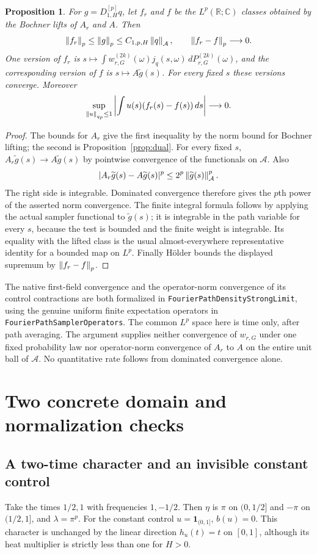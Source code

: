 \documentclass[11pt]{article}
\newtheorem{proposition}[theorem]{Proposition}
\theoremstyle{remark}\newtheorem{remark}[theorem]{Remark}
\newcommand{\R}{\mathbb R}\newcommand{\C}{\mathbb C}
\newcommand{\A}{\mathcal A}\newcommand{\X}{\mathcal X}
\newcommand{\code}[1]{{\small\nolinkurl{#1}}}
\begin{document}
\begin{proposition}\label{prop:strongaveraged}
For $g=D^{[p]}_{1,H}q$, let $f_r$ and $f$ be the $L^p(\R;\C)$
classes obtained by the Bochner lifts of $A_r$ and $A$. Then
\[
 \norm{f_r}_p\le\norm g_p\le C_{1,p,H}\norm q_{\A},\qquad
 \norm{f_r-f}_p\longrightarrow0.
\]
One version of $f_r$ is
$s\mapsto\int w^{(2k)}_{r,G}(\omega)j_q(s,\omega)
\,dP^{(2k)}_{r,G}(\omega)$, and the corresponding version of $f$
is $s\mapsto A\widetilde g(s)$. For every fixed $s$ these versions
converge. Moreover
\[
 \sup_{\left\lVert u\right\rVert_{q_p}\le1}
 \left|\int u(s)(f_r(s)-f(s))\,ds\right|\longrightarrow0.
\]
\end{proposition}
\begin{proof}
The bounds for $A_r$ give the first inequality by the norm bound for
Bochner lifting; the second is Proposition~\ref{prop:dual}.
For every fixed $s$, $A_r\widetilde g(s)\to A\widetilde g(s)$ by
pointwise convergence of the functionals on $\A$. Also
\[
 |A_r\widetilde g(s)-A\widetilde g(s)|^p
       \le2^p\norm{\widetilde g(s)}_{\A}^p.
\]
The right side is integrable. Dominated convergence therefore gives
the $p$th power of the asserted norm convergence. The finite integral
formula follows by applying the actual sampler functional to
$\widetilde g(s)$; it is integrable in the path variable for every
$s$, because the test is bounded and the finite weight is integrable.
Its equality with the lifted class is the usual almost-everywhere
representative identity for a bounded map on $L^p$. Finally H\"older
bounds the displayed supremum by $\left\lVert f_r-f\right\rVert_p$.
\end{proof}

The native first-field convergence and the operator-norm convergence
of its control contractions are both formalized in
\code{FourierPathDensityStrongLimit}, using the genuine uniform
finite expectation operators in \code{FourierPathSamplerOperators}.
The common $L^p$ space here is time only, after path averaging. The
argument supplies neither convergence of $w_{r,G}$ under one fixed
probability law nor operator-norm convergence of $A_r$ to $A$ on
the entire unit ball of $\A$. No quantitative rate follows from
dominated convergence alone.

\section{Two concrete domain and normalization checks}
\subsection{A two-time character and an invisible constant control}
Take the times $1/2,1$ with frequencies $1,-1/2$. Then $\eta$ is $\pi$ on $(0,1/2]$ and $-\pi$ on $(1/2,1]$, and $\lambda=\pi^p$. For the constant control $u=\mathbf1_{(0,1]}$, $b(u)=0$. This character is unchanged by the linear direction $h_u(t)=t$ on $[0,1]$, although its heat multiplier is strictly less than one for $H>0$.
\end{document}
